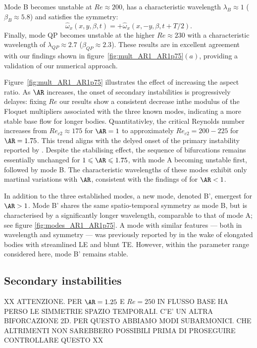 %
Mode B becomes unstable at $Re \approx 200$, has a characteristic wavelength $\lambda_B \approx 1$ ($\beta_B \approx 5.8$) and satisfies the symmetry:
%
\begin{equation}
  \hat{\omega}_x(x,y,\beta,t) = + \hat{\omega}_x(x,-y,\beta,t+T/2).
\end{equation}
%
Finally, mode QP becomes unstable at the higher $Re \approx 230$ with a characteristic wavelength of $\lambda_{QP} \approx 2.7$ ($\beta_{QP} \approx 2.3$). These results are in excellent agreement with our findings shown in figure~\ref{fig:mult_AR1_AR1p75}$(a)$, providing a validation of our numerical approach.

Figure~\ref{fig:mult_AR1_AR1p75} illustrates the effect of increasing the aspect ratio. As $\AR$ increases, the onset of secondary instabilities is progressively delayes: fixing $Re$ our results show a consistent decrease inthe modulus of the Floquet multipliers associated with the three known modes, indicating a more stable base flow for longer bodies. Quantitativley, the critical Reynolds number increases from $Re_{c2} \approx 175$ for $\AR=1$ to approximately $Re_{c2} =200-225$ for $\AR=1.75$. This trend aligns with the delyed onset of the primary instability reported by \cite{chiarini-quadrio-auteri-2021}. Despite the stabilising effect, the sequence of bifurcations remains essentially unchanged for $1 \le \AR \le 1.75$, with mode A becoming unstable first, followed by mode B. The characteristic wavelengths of these modes exhibit only martinal variations with $\AR$, consistent with the findings of \cite{choi-yang-2014} for $\AR<1$.

In addition to the three established modes, a new mode, denoted B', emergest for $\AR>1$. Mode B' shares the same spatio-temporal symmetry as mode B, but is characterised by a significantly longer wavelength, comparable to that of mode A; see figure \ref{fig:modes_AR1_AR1p75}. A mode with similar features --- both in wavelength and symmetry --- was previously reported by \cite{ryan-etal-2006} in the wake of elongated bodies with streamlined LE and blunt TE. However, within the parameter range considered here, mode B' remains stable.

\subsection{Secondary instabilities}

XX ATTENZIONE. PER $\AR=1.25$ E $Re=250$ IN FLUSSO BASE HA PERSO LE SIMMETRIE SPAZIO TEMPORALI. C'E' UN ALTRA BIFORCAZIONE 2D. PER QUESTO ABBIAMO MODI SUBARMONICI. CHE ALTRIMENTI NON SAREBBERO POSSIBILI PRIMA DI PROSEGUIRE CONTROLLARE QUESTO XX

